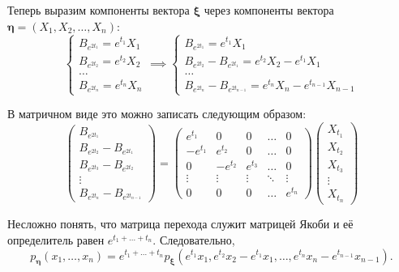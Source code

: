Теперь выразим компоненты вектора \(\bm{\xi}\) через компоненты вектора 
\(\bm{\eta} = (X_{1}, X_{2}, \ldots, X_{n})\):
\[
	\begin{cases}
	B_{e^{2t_{1}}} = e^{t_{1}}X_{1} \\
	B_{e^{2t_{2}}} = e^{t_{2}}X_{2} \\
	\dots \\
	B_{e^{2t_{n}}} = e^{t_{n}}X_{n}
	\end{cases}
	\implies 
	\begin{cases}
	B_{e^{2t_{1}}} = e^{t_{1}}X_{1} \\
	B_{e^{2t_{2}}} - B_{e^{2t_{1}}} = e^{t_{2}}X_{2} - e^{t_{1}}X_{1} \\
	\dots \\
	B_{e^{2t_{n}}} - B_{e^{2t_{n - 1}}} = e^{t_{n}}X_{n} - e^{t_{n - 1}}X_{n - 
	1}
	\end{cases}
\]

В матричном виде это можно записать следующим образом:
\[
	\begin{pmatrix}
	B_{e^{2t_{1}}} \\ B_{e^{2t_{2}}} - B_{e^{2t_{1}}} \\ B_{e^{2t_{3}}} - 
	B_{e^{2t_{2}}} \\ \vdots \\ B_{e^{2t_{n}}} - B_{e^{2t_{n - 1}}}
	\end{pmatrix}
	=
	\begin{pmatrix}
	e^{t_{1}} & 0 & 0 & \ldots & 0 \\
	-e^{t_{1}} & e^{t_{2}} & 0 & \ldots & 0 \\
	0 & -e^{t_{2}} & e^{t_{3}} & \ldots & 0 \\
	\vdots & \vdots & \vdots & \ddots & \vdots \\
	0 & 0 & 0 & \ldots & e^{t_{n}}
	\end{pmatrix}
	\begin{pmatrix}
	X_{t_{1}} \\ X_{t_{2}} \\ X_{t_{3}} \\ \vdots \\ X_{t_{n}}
	\end{pmatrix}
\]

Несложно понять, что матрица перехода служит матрицей Якоби и её определитель 
равен \(e^{t_{1} + \dots + t_{n}}\). Следовательно, 
\[
	p_{\bm{\eta}}(x_{1}, \dots, x_{n}) = e^{t_{1} + \dots + 
	t_{n}}p_{\bm{\xi}}(e^{t_{1}}x_{1}, e^{t_{2}}x_{2} - e^{t_{1}}x_{1}, \dots, 
	e^{t_{n}}x_{n} - e^{t_{n - 1}}x_{n - 1}).
\]

